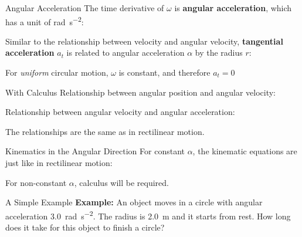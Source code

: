 \documentclass[12pt,compress,aspectratio=169]{beamer}
\begin{document}
\begin{frame}{Angular Acceleration}
  The time derivative of $\omega$ is \textbf{angular acceleration}, which
  has a unit of \si{\radian\per\second\squared}:


  Similar to the relationship between velocity and angular velocity,
  \textbf{tangential acceleration} $a_t$ is related to angular acceleration
  $\alpha$ by the radius $r$:
    
    
  For \emph{uniform} circular motion, $\omega$ is constant, and therefore
  $a_t=0$
\end{frame}



\begin{frame}{With Calculus}
  Relationship between angular position and angular velocity:


  Relationship between angular velocity and angular acceleration:


  The relationships are the same as in rectilinear motion.
\end{frame}




\begin{frame}{Kinematics in the Angular Direction}
  For constant $\alpha$, the kinematic equations are just like in rectilinear
  motion:

  \vspace{-.3in}{\large
    \begin{align*}
      \theta(t) &=\theta_0 + \omega_0 t + \frac12\alpha t^2\\
      \omega(t) &=\omega_0+ \alpha t\\
      \omega(\theta)^2& = \omega_0^2+ 2\alpha(\theta-\theta_0)
    \end{align*}
  }
  
  For non-constant $\alpha$, calculus will be required.
\end{frame}



\begin{frame}{A Simple Example}
  \textbf{Example:} An object moves in a circle with angular acceleration
  \SI{3.0}{\radian\per\second\squared}. The radius is \SI{2.0}{\metre} and it
  starts from rest. How long does it take for this object to finish a circle?
\end{frame}
\end{document}
